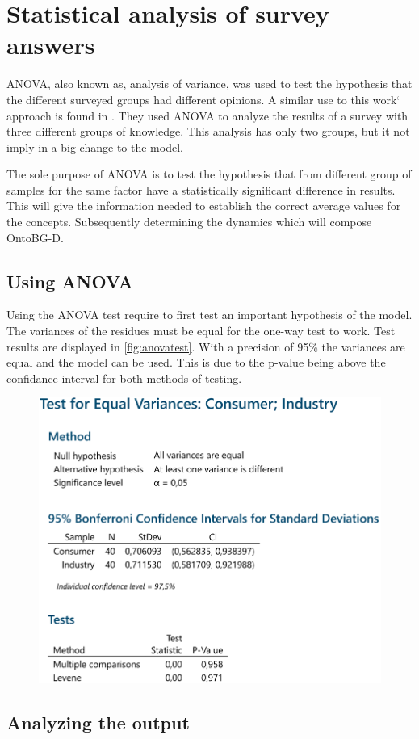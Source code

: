\section{Statistical analysis of survey answers}

ANOVA, also known as, analysis of variance, was used to test the hypothesis that the different surveyed groups had different opinions. A similar use to this work` approach is found in \cite{ismail2007organizational}. They used ANOVA to analyze the results of a survey with three different groups of knowledge. This analysis has only two groups, but it not imply in a big change to the model.

The sole purpose of ANOVA is to test the hypothesis that from different group of samples for the same factor have a statistically significant difference in results. This will give the information needed to establish the correct average values for the concepts. Subsequently determining the dynamics which will compose OntoBG-D.

\subsection{Using ANOVA}

Using the ANOVA test require to first test an important hypothesis of the model. The variances of the residues must be equal for the one-way test to work. Test results are displayed in \autoref{fig:anovatest}. With a precision of 95\% the variances are equal and the model can be used. This is due to the p-value being above the confidance interval for both methods of testing. 
\begin{figure}[h!]
    \centering
    \includegraphics[width=\textwidth]{Images/ANOVA/ANOVATESTENG.png}
    \caption{}
    \label{fig:anovatest}
\end{figure}



\subsection{Analyzing the output}


